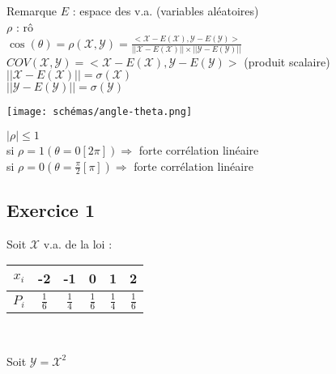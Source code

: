 \documentclass[a4paper, 12pt]{article}
\begin{document}
\begin{remarque}{Remarque}
$E$ : espace des v.a. (variables aléatoires)\\
$\rho$ : rô\\
$\cos (\theta) = \rho (\mathcal{X, Y}) = \frac{<\mathcal{X} - E (\mathcal{X}), \mathcal{Y} - E (\mathcal{Y})>}{|| \mathcal{X} - E (\mathcal{X}) || \times || \mathcal{Y} - E (\mathcal{Y}) ||}$\\
$COV (\mathcal{X, Y}) = <\mathcal{X} - E (\mathcal{X}), \mathcal{Y} - E (\mathcal{Y})>$ (produit scalaire)\\
$|| \mathcal{X} - E (\mathcal{X}) || = \sigma(\mathcal{X})$\\
$|| \mathcal{Y} - E (\mathcal{Y}) || = \sigma(\mathcal{Y})$\\
\begin{center}
\texttt{[image: schémas/angle-theta.png]}
\end{center}
$|\rho| \leq 1$\\
si $\rho = 1 (\theta = 0 [2\pi]) \Rightarrow$ forte corrélation linéaire\\
si $\rho = 0 (\theta = \frac{\pi}{2} [\pi]) \Rightarrow$ forte corrélation linéaire\\

\end{remarque}

\subsection{Exercice 1}
Soit $\mathcal{X}$ v.a. de la loi :\\
{\Large
\begin{center}
\begin{tabular}{c|ccccc}
	$x_i$ & -2 & -1 & 0 & 1 & 2 \\
	\hline
	$P_i$ & $\frac{1}{6}$ & $\frac{1}{4}$ & $\frac{1}{6}$ & $\frac{1}{4}$ & $\frac{1}{6}$ \\
\end{tabular}\\
\end{center}
}
Soit $\mathcal{Y} = \mathcal{X}^2$
\end{document}
